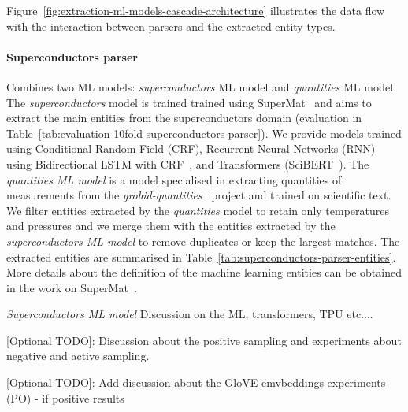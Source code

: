 \documentclass{article}
\begin{document}
Figure~\ref{fig:extraction-ml-models-cascade-architecture} illustrates the data flow with the interaction between parsers and the extracted entity types. 

\paragraph{Superconductors parser}
Combines two ML models: \textit{superconductors} ML model and \textit{quantities} ML model.
The \textit{superconductors} model is trained trained using SuperMat~\cite{foppiano2021supermat} and aims to extract the main entities from the superconductors domain (evaluation in Table~\ref{tab:evaluation-10fold-superconductors-parser}).
We provide models trained using Conditional Random Field (CRF), Recurrent Neural Networks (RNN) using Bidirectional LSTM with CRF~\cite{Lample2016NeuralAF}, and Transformers (SciBERT~\cite{Beltagy2019SciBERT}).
The \textit{quantities ML model} is a model specialised in extracting quantities of measurements from the \textit{grobid-quantities}~\cite{foppiano2019quantities} project and trained on scientific text.
We filter entities extracted by the \textit{quantities} model to retain only temperatures and pressures and we merge them with the entities extracted by the \textit{superconductors ML model} to remove duplicates or keep the largest matches.
The extracted entities are summarised in Table~\ref{tab:superconductors-parser-entities}. More details about the definition of the machine learning entities can be obtained in the work on SuperMat~\cite{foppiano2021supermat}.

\emph{Superconductors ML model} 
Discussion on the ML, transformers, TPU etc.... 



[Optional TODO]: Discussion about the positive sampling and experiments about negative and active sampling. 

[Optional TODO]: Add discussion about the GloVE emvbeddings experiments (PO) - if positive results
\end{document}
